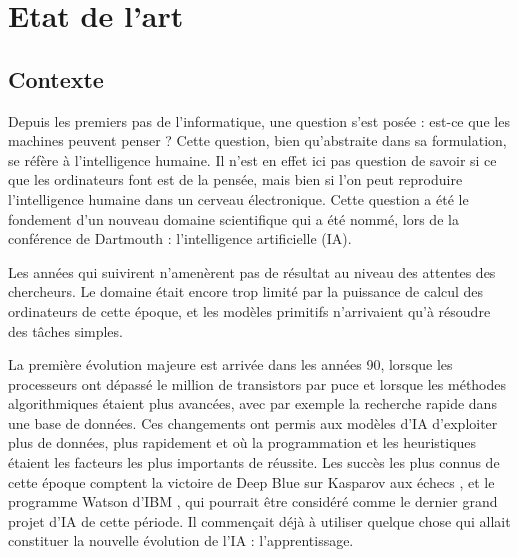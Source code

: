 \chapter{Etat de l'art}
	\minitoc
	\newpage






\section{Contexte}

	Depuis les premiers pas de l'informatique, une question s'est posée : est-ce que les machines peuvent penser ? \cite{turing1950computing} Cette question, bien qu'abstraite dans sa formulation, se réfère à l'intelligence humaine. Il n'est en effet ici pas question de savoir si ce que les ordinateurs font est de la pensée, mais bien si l'on peut reproduire l'intelligence humaine dans un cerveau électronique. Cette question a été le fondement d'un nouveau domaine scientifique qui a été nommé, lors de la conférence de Dartmouth \cite{mccarthy1955proposal} : l'intelligence artificielle (IA).

	Les années qui suivirent n'amenèrent pas de résultat au niveau des attentes des chercheurs. Le domaine était encore trop limité par la puissance de calcul des ordinateurs de cette époque, et les modèles primitifs n'arrivaient qu'à résoudre des tâches simples.

	La première évolution majeure est arrivée dans les années 90, lorsque les processeurs ont dépassé le million de transistors par puce et lorsque les méthodes algorithmiques étaient plus avancées, avec par exemple la recherche rapide dans une base de données. Ces changements ont permis aux modèles d'IA d'exploiter plus de données, plus rapidement et où la programmation et les heuristiques étaient les facteurs les plus importants de réussite. Les succès les plus connus de cette époque comptent la victoire de Deep Blue sur Kasparov aux échecs \cite{campbell2002deep}, et le programme Watson d'IBM \cite{ferrucci2012introduction}, qui pourrait être considéré comme le dernier grand projet d'IA de cette période. Il commençait déjà à utiliser quelque chose qui allait constituer la nouvelle évolution de l'IA : l'apprentissage.

